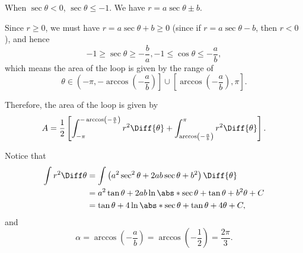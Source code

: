 \begin{enumerate}
          \begin{center}
              
          \end{center}

          When \(\sec \theta < 0\), \(\sec\theta \leq -1\). We have \(r = a \sec \theta \pm b\).

          Since \(r \geq 0\), we must have \(r = a \sec \theta + b \geq 0\) (since if \(r = a \sec \theta - b\), then \(r < 0\)), and hence
          \[
              -1 \geq \sec\theta  \geq -\frac{b}{a}, -1 \leq \cos\theta \leq -\frac{a}{b},
          \]
          which means the area of the loop is given by the range of
          \[
              \theta \in \left(-\pi, -\arccos\left(-\frac{a}{b}\right)\right] \cup \left[\arccos\left(-\frac{a}{b}\right), \pi\right].
          \]

          Therefore, the area of the loop is given by
          \[
              A = \frac{1}{2}\left[\int_{-\pi}^{-\arccos\left(-\frac{a}{b}\right)} r^2 \Diff{\theta} + \int_{\arccos\left(-\frac{a}{b}\right)}^{\pi} r^2 \Diff{\theta}\right].
          \]

          Notice that
          \begin{align*}
              \int r^2 \Diff \theta & = \int\left(a^2 \sec^2\theta + 2ab \sec\theta + b^2\right) \Diff{\theta} \\
                                    & = a^2 \tan\theta + 2ab \ln\abs*{\sec\theta + \tan\theta} + b^2\theta + C \\
                                    & = \tan\theta + 4\ln\abs*{\sec\theta+\tan\theta} + 4\theta + C,
          \end{align*}
          and \[
              \alpha = \arccos\left(-\frac{a}{b}\right) = \arccos\left(-\frac{1}{2}\right) = \frac{2\pi}{3}.
          \]


\end{enumerate}
